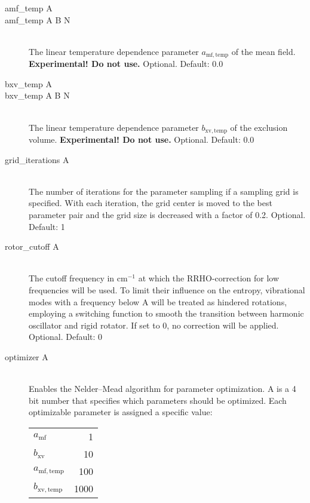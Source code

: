 \documentclass{scrartcl}
\newcommand{\bxv}{b_\mathrm{xv}}
\begin{document}
\begin{description}
    \item[amf\_temp A]
    \item[amf\_temp A B N] \hfill \\
        The linear temperature dependence parameter $a_\mathrm{mf,temp}$ of the mean field.
        \textbf{Experimental! Do not use.}
        Optional. Default: 0.0
        \vspace{0.1cm}
    \item[bxv\_temp A]
    \item[bxv\_temp A B N] \hfill \\
        The linear temperature dependence parameter $b_\mathrm{xv,temp}$ of the exclusion volume.
        \textbf{Experimental! Do not use.}
        Optional. Default: 0.0
        \vspace{0.1cm}
    \item[grid\_iterations A] \hfill \\
        The number of iterations for the parameter sampling if a sampling grid is specified.
        With each iteration, the grid center is moved to the best parameter pair and the grid size is decreased with a factor of 0.2.
        Optional. Default: 1
    \item[rotor\_cutoff A] \hfill \\
        The cutoff frequency in cm$^{-1}$ at which the RRHO-correction for low frequencies will be used.
        To limit their influence on the entropy, vibrational modes with a frequency below A will be treated as hindered rotations, employing a switching function to smooth the transition between harmonic oscillator and rigid rotator. If set to 0, no correction will be applied.
        Optional. Default: 0
    \item[optimizer A] \hfill \\
        Enables the Nelder--Mead algorithm for parameter optimization.
        A is a 4 bit number that specifies which parameters should be optimized.
        Each optimizable parameter is assigned a specific value:
        \begin{table}[h!]
        \hspace{1cm}
        \begin{tabular}{lr}
        $a_\mathrm{mf}$      &    1 \\
        $b_\mathrm{xv}$      &   10 \\
        $a_\mathrm{mf,temp}$ &  100 \\
        $b_\mathrm{xv,temp}$ & 1000 \\
        \end{tabular}
        \end{table}
        

\end{description}
\end{document}
